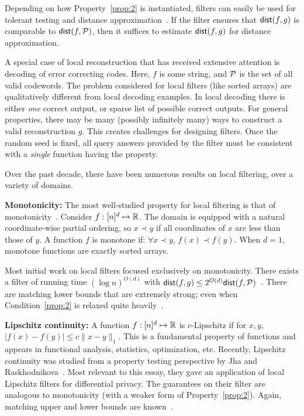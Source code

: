 \documentclass[natbib]{svcyclop}
\def\dist{{\sf dist}}
\begin{document}
Depending on how Property~\ref{prop:2} is instantiated, filters
can easily be used for tolerant testing and distance approximation~\cite{PRR04}. If the filter ensures
that $\dist(f,g)$ is comparable to $\dist(f,\cP)$, then it suffices to estimate $\dist(f,g)$
for distance approximation. 
%

A special case of local reconstruction that has received extensive attention is decoding of error correcting codes. 
Here, $f$ is some string, and $\mathcal{P}$ is the set of all valid codewords. 
The problem considered for local filters (like sorted arrays)
are qualitatively different from local decoding examples.
In local decoding there is either \emph{one} correct output, or 
sparse list of possible correct outputs. For general properties,
there may be many (possibly infinitely many) ways
to construct a valid reconstruction $g$. This creates challenges
for designing filters. Once the random seed is fixed, all query answers
provided by the filter must be consistent with a {\em single} function
having the property.



\KeyRes

Over the past decade, there have been numerous results on local filtering,
over a variety of domains. 

{\bf Monotonicity:} The most well-studied property for local filtering
is that of monotonicity~\cite{ACCL2,SS06,BhGr+12,AwJh+12}. Consider $f:[n]^d \mapsto \mathbb{R}$. The domain
is equipped with a natural coordinate-wise partial ordering, so $x \prec y$
if all coordinates of $x$ are less than those of $y$. A function $f$
is monotone if: $\forall x \prec y$, $f(x) \prec f(y)$. When $d=1$,
monotone functions are exactly sorted arrays.

Most initial work on local filters focused exclusively on monotonicity.
There exists a filter of running
time $(\log n)^{O(d)}$ with $\dist(f,g) \leq 2^{O(d)}\dist(f,\cP)$~\cite{SS06}.
There are matching lower bounds that are extremely strong; even when Condition~\ref{prop:2}
is relaxed quite heavily~\cite{AwJh+12}.

{\bf Lipschitz continuity:} A function $f:[n]^d \mapsto \mathbb{R}$ is $c$-Lipschitz
if for $x,y$, $|f(x) - f(y)| \leq c\|x-y\|_1$. This is a fundamental property
of functions and appears in functional analysis, statistics, optimization, etc.
Recently, Lipschitz continuity was studied from a property testing perspective by Jha and Raskhodnikova~\cite{JhRa13}.
Most relevant to this essay, they gave an application of local Lipschitz filters
for differential privacy. The guarantees on their filter are analogous to monotonicity
(with a weaker form of Property~\ref{prop:2}). Again, matching upper and lower bounds
are known~\cite{JhRa13,AwJh+12-2}.
\end{document}
